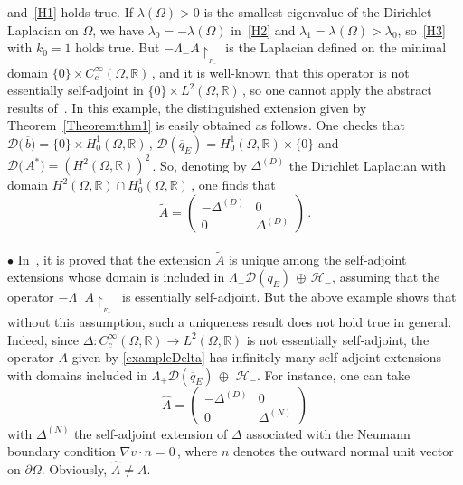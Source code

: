 \documentclass[12pt,reqno]{amsart}
\newcommand{\R}{{\mathbb R}}
\renewcommand{\(}{\left(}
\renewcommand{\)}{\right)}
\begin{document}
and~\eqref{H1} holds true.
If $\lambda(\Omega)>0$ is the smallest eigenvalue of the Dirichlet Laplacian on $\Omega$, we have $\lambda_0=-\lambda(\Omega)$ in~\eqref{H2} and $\lambda_1= \lambda(\Omega)>\lambda_0$, so~\eqref{H3} with $k_0=1$  holds true. But $-\Lambda_- A\upharpoonright_{_{F_-}}$ is the Laplacian defined on the minimal domain $\{0\}\times C^\infty_c(\Omega, \R)\,$, and it is well-known that this operator is not essentially self-adjoint in $\{0\}\times L^2(\Omega, \R)\,$, so one cannot apply the abstract results of~\cite{EstLos-08,SST20}.
In this example, the distinguished extension given by Theorem~\ref{Theorem:thm1} is easily obtained as follows. One checks that $\mathcal D\big(\,\overline{b}\big)= \{0\}\times H^1_0(\Omega, \R)\,$, $\mathcal D(\overline{q}_E)= H^1_0(\Omega, \R)\times \{0\}$ and $\mathcal D\big(\,A^*\big)= \left( H^2(\Omega, \R)\right)^2\,$. So, denoting by $\Delta^{(D)}$ the Dirichlet Laplacian with domain $H^2(\Omega, \R)\cap H^1_0(\Omega, \R)\,$, one finds that
\[\widetilde A=\begin{pmatrix} -\Delta^{(D)} & 0\\0 & \Delta^{(D)}\end{pmatrix}\,.\]
\\[2pt] $\bullet$ In~\cite{SST20}, it is proved that the extension $\widetilde A$ is unique among the self-adjoint extensions whose domain is included in $\Lambda_+\mathcal D(\overline{q}_E) \,\oplus\, \mathcal H_-$, assuming that the operator $-\Lambda_-A\upharpoonright_{_{F_-}}\,$ is essentially self-adjoint. But the above example shows that without this assumption, such a uniqueness result does not hold true in general. Indeed, since $\Delta: C^\infty_c(\Omega, \R) \rightarrow L^2(\Omega, \R)$ is not essentially self-adjoint, the operator $A$ given by \eqref{exampleDelta} has infinitely many self-adjoint extensions with domains included in $\Lambda_+\mathcal D(\overline{q}_E) \,\oplus\, \, \mathcal H_-$. For instance, one can take
\[\hat{A}=\begin{pmatrix} -\Delta^{(D)} & 0\\0 & \Delta^{(N)}\end{pmatrix}\]
with $\Delta^{(N)}$ the self-adjoint extension of $\Delta$ associated with the Neumann boundary condition $\nabla v\cdot n=0\,$, where $n$ denotes the outward normal unit vector on  $\partial\Omega$. Obviously, $\hat{A}\neq \widetilde A$.
\end{document}

